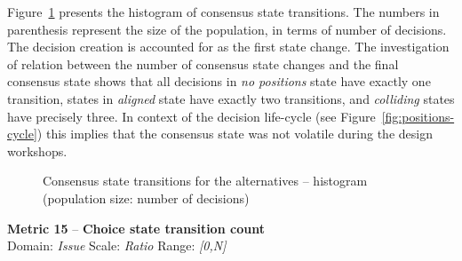 \documentclass[article]{elsarticle}
\begin{document}
Figure~\ref{fig:M14} presents the histogram of consensus state transitions. The numbers in parenthesis represent the size of the population, in terms of number of decisions. The decision creation is accounted for as the first state change. The investigation of relation between the number of consensus state changes and the final consensus state shows that all decisions in \emph{no positions} state have exactly one transition, states in \emph{aligned} state have exactly two transitions, and \emph{colliding} states have precisely three. In context of the decision life-cycle (see Figure~\ref{fig:positions-cycle}) this implies that the consensus state was not volatile during the design workshops.  
\begin{figure}
  \begin{center}
 

  \caption{Consensus state transitions for the alternatives -- histogram (population size: number of decisions)}
  \label{fig:M14}
  \end{center}
\end{figure}

\vspace{1em}
\noindent
\textbf{Metric 15} -- \textbf{Choice state transition count}\\
Domain: \emph{Issue} Scale: \emph{Ratio} Range: \emph{[0,N]}\\
\end{document}
